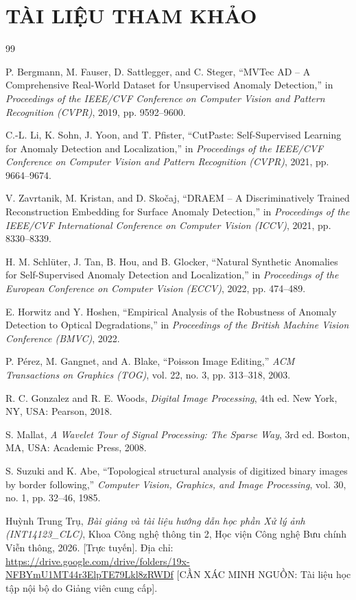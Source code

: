 \chapter*{TÀI LIỆU THAM KHẢO}

\begin{thebibliography}{99}

P. Bergmann, M. Fauser, D. Sattlegger, and C. Steger, ``MVTec AD -- A Comprehensive Real-World Dataset for Unsupervised Anomaly Detection,'' in \textit{Proceedings of the IEEE/CVF Conference on Computer Vision and Pattern Recognition (CVPR)}, 2019, pp. 9592--9600.

C.-L. Li, K. Sohn, J. Yoon, and T. Pfister, ``CutPaste: Self-Supervised Learning for Anomaly Detection and Localization,'' in \textit{Proceedings of the IEEE/CVF Conference on Computer Vision and Pattern Recognition (CVPR)}, 2021, pp. 9664--9674.

V. Zavrtanik, M. Kristan, and D. Sko{\v{c}}aj, ``DRAEM -- A Discriminatively Trained Reconstruction Embedding for Surface Anomaly Detection,'' in \textit{Proceedings of the IEEE/CVF International Conference on Computer Vision (ICCV)}, 2021, pp. 8330--8339.

H. M. Schl{\"u}ter, J. Tan, B. Hou, and B. Glocker, ``Natural Synthetic Anomalies for Self-Supervised Anomaly Detection and Localization,'' in \textit{Proceedings of the European Conference on Computer Vision (ECCV)}, 2022, pp. 474--489.

E. Horwitz and Y. Hoshen, ``Empirical Analysis of the Robustness of Anomaly Detection to Optical Degradations,'' in \textit{Proceedings of the British Machine Vision Conference (BMVC)}, 2022.

P. P{\'e}rez, M. Gangnet, and A. Blake, ``Poisson Image Editing,'' \textit{ACM Transactions on Graphics (TOG)}, vol. 22, no. 3, pp. 313--318, 2003.

R. C. Gonzalez and R. E. Woods, \textit{Digital Image Processing}, 4th ed. New York, NY, USA: Pearson, 2018.

S. Mallat, \textit{A Wavelet Tour of Signal Processing: The Sparse Way}, 3rd ed. Boston, MA, USA: Academic Press, 2008.

S. Suzuki and K. Abe, ``Topological structural analysis of digitized binary images by border following,'' \textit{Computer Vision, Graphics, and Image Processing}, vol. 30, no. 1, pp. 32--46, 1985.

Huỳnh Trung Trụ, \textit{Bài giảng và tài liệu hướng dẫn học phần Xử lý ảnh (INT14123\_CLC)}, Khoa Công nghệ thông tin 2, Học viện Công nghệ Bưu chính Viễn thông, 2026. [Trực tuyến]. Địa chỉ: \url{https://drive.google.com/drive/folders/19x-NFBYmU1MT44r3ElpTE79Lkl8zRWDf} [CẦN XÁC MINH NGUỒN: Tài liệu học tập nội bộ do Giảng viên cung cấp].

\end{thebibliography}

